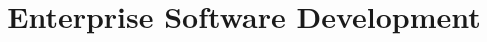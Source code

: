\title{Enterprise Software Development}
\def\TitleImage{fontys-logo.pdf}
\providecommand\TopicBreak{\vspace{5mm}\hrule\vspace{5mm}}

\maketitle

\clearpage




\vspace{1.5cm}

